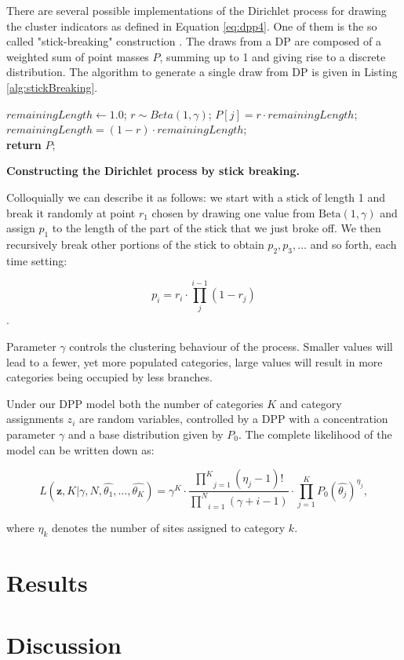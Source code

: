 There are several possible implementations of the Dirichlet process for drawing the cluster indicators as defined in Equation \ref{eq:dpp4}. 
One of them is the so called "stick-breaking" construction \citep{Sethuraman94}.
The draws from a DP are composed of a weighted sum of point masses $P$, summing up to 1 and giving rise to a discrete distribution.
The algorithm to generate a single draw from DP is given in Listing \ref{alg:stickBreaking}.

\begin{algorithm}[H]
\begin{center}
\begin{algorithmic}[1]
\footnotesize{
%
\State $remainingLength \gets 1.0$;
%
%
\State $r\sim Beta\left(1,\gamma\right)$;
%
\State $P\left[j\right]=r \cdot remainingLength$;
%
\State $remainingLength=\left(1-r\right) \cdot remainingLength$;
%
\EndFor \\
%
 \textbf{return} $P$;
}
\end{algorithmic}
\end{center}
\caption{ { \footnotesize {\bf Constructing the Dirichlet process by stick breaking.} } }
\label{alg:stickBreaking}
\end{algorithm}

Colloquially we can describe it as follows: we start with a stick of length 1 and break it randomly at point $r_{1}$ chosen by drawing one value from $\text{Beta}(1, \gamma)$ and assign $p_{1}$ to the length of the part of the stick that we just broke off.
We then recursively break other portions of the stick to obtain $p_{2}, p_{3}, \ldots$ and so forth, each time setting:

$$p_{i}=r_{i}\cdot\underset{j}{\overset{i-1}{\prod}}\left(1-r_{j}\right)$$.

\noindent
Parameter $\gamma$ controls the clustering behaviour of the process.
Smaller values will lead to a fewer, yet more populated categories, large values will result in more categories being occupied by less branches.

Under our DPP model both the number of categories $K$ and category assignments $z_{i}$ are random variables, controlled by a DPP with a concentration parameter $\gamma$ and a base distribution given by $P_{0}$.
The complete likelihood of the model can be written down as:

\begin{equation}
L(\mathbf{z},K|\gamma,N,\hat{\theta_{1}},\ldots,\hat{\theta_{K}})=\gamma^{K}\cdot\frac{\underset{j=1}{\overset{K}{\prod}}\left(\eta_{j}-1\right)!}{\underset{i=1}{\overset{N}{\prod}}\left(\gamma+i-1\right)}\cdot\underset{j=1}{\overset{K}{\prod}}P_{0}\left(\hat{\theta_{j}}\right)^{\eta_{j}},
\label{eq:dppLike} 
\end{equation} 

\noindent 
where $\eta_{k}$ denotes the number of sites assigned to category $k$.

\section{Results}




\section{Discussion}



